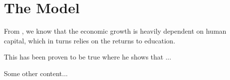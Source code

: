 

\chapter{The Model}
\label{Chapter2}
From \textcite{barro2013}, we know that the economic growth is heavily dependent on human capital, which in turns relies on the returns to education.

This has been proven to be true \parencite{Acemoglu2007} where he shows that ...

Some other content...